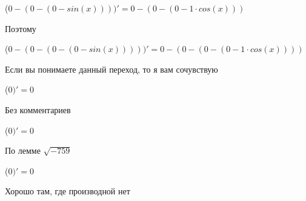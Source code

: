 \documentclass[12pt,a4paper,fleqn]{article}
\begin{document}
\begin{center}
\begin{center}
\begin{center}
\begin{center}
\begin{center}
\begin{center}
\begin{center}
\begin{center}
\begin{center}
\begin{center}
\begin{center}
\begin{center}
\begin{center}
\begin{center}
\begin{center}
\begin{center}
\begin{center}
\begin{center}
\begin{center}
\begin{center}
\begin{center}
\begin{center}
\begin{center}
\begin{center}
\begin{center}
\begin{center}
\begin{center}
\begin{center}
\begin{center}
\begin{center}
\begin{center}
\begin{center}
\begin{center}
\begin{center}
\begin{center}
\begin{center}
\begin{center}
\begin{center}
\begin{center}
\begin{center}
\begin{center}
\begin{center}
\begin{center}
\begin{center}
\begin{center}
\begin{center}
\begin{center}
\begin{center}
\begin{center}
\begin{center}
\begin{center}
\begin{center}
\begin{center}
\begin{center}
\begin{center}
\begin{center}
\begin{center}
\begin{center}
\begin{center}
\begin{center}
\begin{center}
\begin{center}
\begin{center}
\begin{center}
\begin{center}
\begin{center}
\begin{center}
\begin{center}
\begin{center}
\begin{center}
\begin{center}
\begin{center}
\begin{center}
\begin{center}
\begin{center}
\begin{center}
\begin{center}
\begin{center}
\begin{center}
\begin{center}
\begin{center}
 ($0-(0-(0-sin(x))))'
  = 0-(0-(0-1 \cdot cos(x)))$\end{center}
Поэтому

\begin{center}
 ($0-(0-(0-(0-sin(x)))))'
  = 0-(0-(0-(0-1 \cdot cos(x))))$\end{center}
Если вы понимаете данный переход, то я вам сочувствую

\begin{center}
 ($0)'
  = 0$\end{center}
Без комментариев\cite{link4}

\begin{center}
 ($0)'
  = 0$\end{center}
По лемме $\sqrt{-759}$
\begin{center}
 ($0)'
  = 0$\end{center}
Хорошо там, где производной нет\cite{link2}


\end{center}
\end{center}
\end{center}
\end{center}
\end{center}
\end{center}
\end{center}
\end{center}
\end{center}
\end{center}
\end{center}
\end{center}
\end{center}
\end{center}
\end{center}
\end{center}
\end{center}
\end{center}
\end{center}
\end{center}
\end{center}
\end{center}
\end{center}
\end{center}
\end{center}
\end{center}
\end{center}
\end{center}
\end{center}
\end{center}
\end{center}
\end{center}
\end{center}
\end{center}
\end{center}
\end{center}
\end{center}
\end{center}
\end{center}
\end{center}
\end{center}
\end{center}
\end{center}
\end{center}
\end{center}
\end{center}
\end{center}
\end{center}
\end{center}
\end{center}
\end{center}
\end{center}
\end{center}
\end{center}
\end{center}
\end{center}
\end{center}
\end{center}
\end{center}
\end{center}
\end{center}
\end{center}
\end{center}
\end{center}
\end{center}
\end{center}
\end{center}
\end{center}
\end{center}
\end{center}
\end{center}
\end{center}
\end{center}
\end{center}
\end{center}
\end{center}
\end{center}
\end{center}
\end{center}
\end{center}
\end{document}
